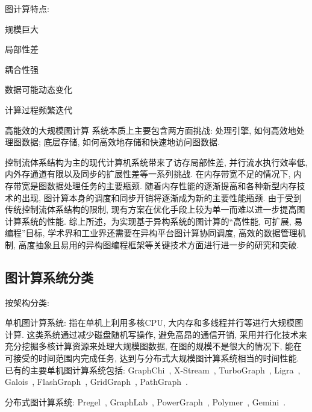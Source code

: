 \documentclass[UTF8,12pt,a4paper]{article}
\begin{document}
图计算特点:
\begin{compactitem}
  \item 规模巨大
  \item 局部性差
  \item 耦合性强
  \item 数据可能动态变化
  \item 计算过程频繁迭代
\end{compactitem}

高能效的大规模图计算
系统本质上主要包含两方面挑战:
处理引擎, 如何高效地处理图数据;
底层存储, 如何高效地存储和快速地访问图数据.

控制流体系结构为主的现代计算机系统带来了访存局部性差, 并行流水执行效率低,
内外存通道有限以及同步的扩展性差等一系列挑战.
在内存带宽不足的情况下, 内存带宽是图数据处理任务的主要瓶颈.
随着内存性能的逐渐提高和各种新型内存技术的出现,
图计算本身的调度和同步开销将逐渐成为新的主要性能瓶颈.
由于受到传统控制流体系结构的限制,
现有方案在优化手段上较为单一而难以进一步提高图计算系统的性能.
综上所述，为实现基于异构系统的图计算的``高性能, 可扩展, 易编程''目标,
学术界和工业界还需要在异构平台图计算协同调度, 高效的数据管理机制,
高度抽象且易用的异构图编程框架等关键技术方面进行进一步的研究和突破.

\subsection{图计算系统分类}
按架构分类:
\begin{compactitem}
  \item 单机图计算系统: 指在单机上利用多核CPU, 大内存和多线程并行等进行大规模图计算.
  这类系统通过减少磁盘随机写操作, 避免高昂的通信开销,
  采用并行化技术来充分挖掘多核计算资源来处理大规模图数据,
  在图的规模不是很大的情况下, 能在可接受的时间范围内完成任务,
  达到与分布式大规模图计算系统相当的时间性能.
  已有的主要单机图计算系统包括: GraphChi~\cite{DBLP:conf/osdi/KyrolaBG12},
  X-Stream~\cite{DBLP:conf/sosp/RoyMZ13},
  TurboGraph~\cite{DBLP:conf/kdd/HanLPL0KY13},
  Ligra~\cite{DBLP:conf/ppopp/ShunB13},
  Galois~\cite{DBLP:conf/sosp/NguyenLP13},
  FlashGraph~\cite{DBLP:conf/fast/ZhengMBVPS15},
  GridGraph~\cite{DBLP:conf/usenix/ZhuHC15},
  PathGraph~\cite{DBLP:journals/tpds/YuanXLJ16}.
  \item 分布式图计算系统: Pregel~\cite{DBLP:conf/sigmod/MalewiczABDHLC10},
  GraphLab~\cite{DBLP:journals/pvldb/LowGKBGH12},
  PowerGraph~\cite{DBLP:conf/osdi/GonzalezLGBG12},
  Polymer~\cite{DBLP:conf/ppopp/ZhangCC15},
  Gemini~\cite{DBLP:conf/osdi/ZhuCZM16}.
\end{compactitem}
\end{document}
